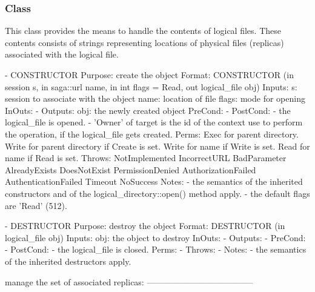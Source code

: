  
 
  \subsubsection*{Class }
 
    This class provides the means to handle the contents
    of logical files.  These contents consists of strings
    representing locations of physical files (replicas)
    associated with the logical file.  
 
 \begin{myspec}
    - CONSTRUCTOR
      Purpose:  create the object
      Format:   CONSTRUCTOR      (in session    s,
                                  in  saga::url name,
                                  in  int       flags = Read,
                                  out logical_file  obj)
      Inputs:   s:                session to associate with
                                  the object
                name:             location of file
                flags:            mode for opening
      InOuts:   -
      Outputs:  obj:              the newly created object
      PreCond:  -
      PostCond: - the logical_file is opened.
                - 'Owner' of target is the id of the context
                  use to perform the operation, if the
                  logical_file gets created.
      Perms:    Exec  for parent directory.
                Write for parent directory if Create is set.
                Write for name if Write is set.
                Read  for name if Read  is set.
      Throws:   NotImplemented
                IncorrectURL
                BadParameter
                AlreadyExists
                DoesNotExist
                PermissionDenied
                AuthorizationFailed
                AuthenticationFailed
                Timeout
                NoSuccess
      Notes:    - the semantics of the inherited constructors
                  and of the logical_directory::open() method 
                  apply.
                - the default flags are 'Read' (512).
 
 
    - DESTRUCTOR
      Purpose:  destroy the object
      Format:   DESTRUCTOR       (in  logical_file   obj)
      Inputs:   obj:              the object to destroy
      InOuts:   -
      Outputs:  -
      PreCond:  -
      PostCond: - the logical_file is closed.
      Perms:    -
      Throws:   -
      Notes:    - the semantics of the inherited destructors
                  apply.
 
 
      manage the set of associated replicas:
      --------------------------------------
 

\end{myspec}

